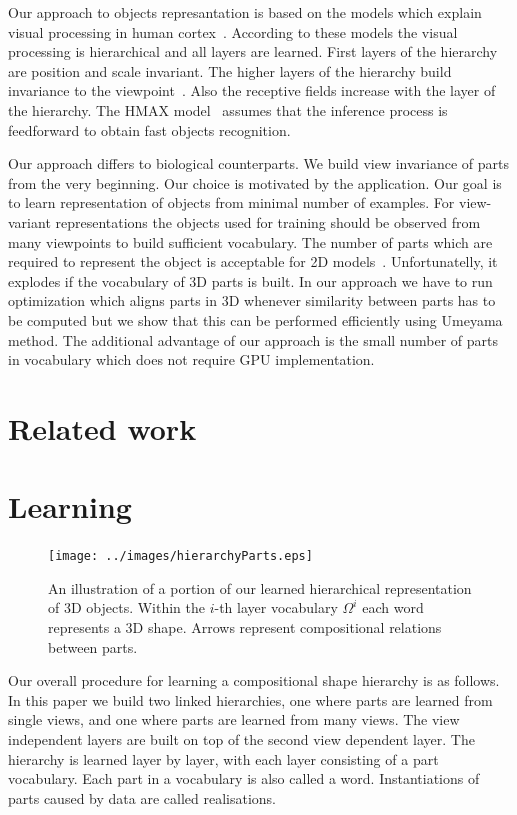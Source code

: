 \documentclass[letterpaper,10pt,conference]{ieeeconf}  %
\begin{document}
Our approach to objects represantation is based on the models which explain visual processing in human cortex~\cite{Riesenhuber1999}. According to these models the visual processing is hierarchical and all layers are learned. First layers of the hierarchy are position and scale invariant. The higher layers of the hierarchy build invariance to the viewpoint~\cite{Spehr2015}. Also the receptive fields increase with the layer of the hierarchy. The HMAX model~\cite{Serre2007} assumes that the inference process is feedforward to obtain fast objects recognition.

Our approach differs to biological counterparts. We build view invariance of parts from the very beginning. Our choice is motivated by the application. Our goal is to learn representation of objects from minimal number of examples. For view-variant representations the objects used for training should be observed from many viewpoints to build sufficient vocabulary. The number of parts which are required to represent the object is acceptable for 2D models~\cite{Fiedler2014}. Unfortunatelly, it explodes if the vocabulary of 3D parts is built. In our approach we have to run optimization which aligns parts in 3D whenever similarity between parts has to be computed but we show that this can be performed efficiently using Umeyama method. The additional advantage of our approach is the small number of parts in vocabulary which does not require GPU implementation.

\section{Related work}

\section{Learning}

\begin{figure}[t]
 \centering
\texttt{[image: ../images/hierarchyParts.eps]}
\caption{An illustration of a portion of our learned hierarchical representation of 3D objects. Within the $i$-th layer vocabulary $\Omega^i$ each word represents a 3D shape. Arrows represent compositional relations between parts.}
 \label{hierarchyParts}
\end{figure}

Our overall procedure for learning a compositional shape hierarchy is as follows. In this paper we build two linked hierarchies, one where parts are learned from single views, and one where parts are learned from many views. The view independent layers are built on top of the second view dependent layer. The hierarchy is learned layer by layer, with each layer consisting of a part vocabulary. Each part in a vocabulary is also called a word. Instantiations of parts caused by data are called realisations. 
\end{document}

